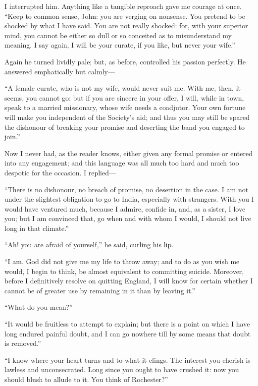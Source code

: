 I interrupted him. Anything like a tangible reproach gave me courage at
once. \enquote{Keep to common sense, \St{} John: you are verging on
	nonsense. You pretend to be shocked by what I have said. You are not
	really shocked: for, with your superior mind, you cannot be either so
	dull or so conceited as to misunderstand my meaning. I say again, I
	will be your curate, if you like, but never your wife.}

Again he turned lividly pale; but, as before, controlled his passion
perfectly. He answered emphatically but calmly---

\enquote{A female curate, who is not my wife, would never suit me. With
	me, then, it seems, you cannot go: but if you are sincere in your offer,
	I will, while in town, speak to a married missionary, whose wife needs a
	coadjutor. Your own fortune will make you independent of the Society's
	aid; and thus you may still be spared the dishonour of breaking your
	promise and deserting the band you engaged to join.}

Now I never had, as the reader knows, either given any formal promise or
entered into any engagement; and this language was all much too hard and
much too despotic for the occasion. I replied---

\enquote{There is no dishonour, no breach of promise, no desertion in
	the case. I am not under the slightest obligation to go to India,
	especially with strangers. With you I would have ventured much, because
	I admire, confide in, and, as a sister, I love you; but I am convinced
	that, go when and with whom I would, I should not live long in that
	climate.}

\enquote{Ah! you are afraid of yourself,} he said, curling his lip.

\enquote{I am. God did not give me my life to throw away; and to do as
	you wish me would, I begin to think, be almost equivalent to committing
	suicide. Moreover, before I definitively resolve on quitting England, I
	will know for certain whether I cannot be of greater use by remaining in
	it than by leaving it.}

\enquote{What do you mean?}

\enquote{It would be fruitless to attempt to explain; but there is a
	point on which I have long endured painful doubt, and I can go nowhere
	till by some means that doubt is removed.}

\enquote{I know where your heart turns and to what it clings. The
	interest you cherish is lawless and unconsecrated. Long since you ought
	to have crushed it: now you should blush to allude to it. You think of
	\Mr{} Rochester?}

